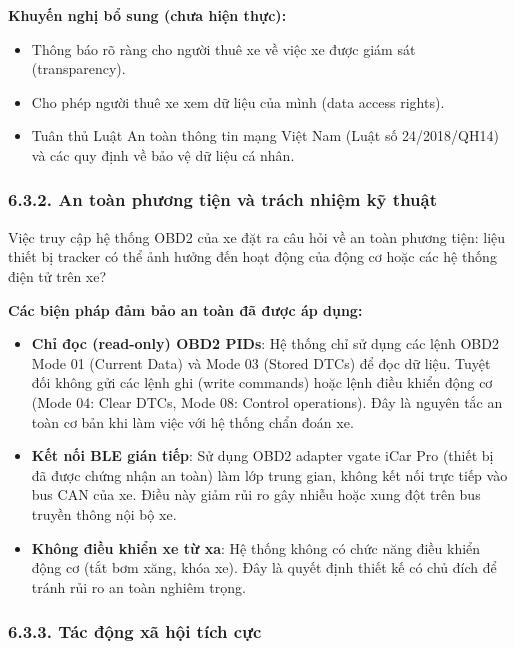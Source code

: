 \documentclass[13pt,a4paper]{extarticle}
\renewcommand{\\}{\thesislongtableorignewline\hline}%
\providecommand{\tightlist}{%
  \setlength{\itemsep}{0pt}\setlength{\parskip}{0pt}}
\begin{document}
\textbf{Khuyến nghị bổ sung (chưa hiện thực):}

\begin{itemize}
\tightlist
\item
  Thông báo rõ ràng cho người thuê xe về việc xe được giám sát
  (transparency).
\item
  Cho phép người thuê xe xem dữ liệu của mình (data access rights).
\item
  Tuân thủ Luật An toàn thông tin mạng Việt Nam (Luật số 24/2018/QH14)
  và các quy định về bảo vệ dữ liệu cá nhân.
\end{itemize}

\subsubsection{6.3.2. An toàn phương tiện và trách nhiệm kỹ
thuật}\label{632-an-touxe0n-phux1b0ux1a1ng-tiux1ec7n-vuxe0-truxe1ch-nhiux1ec7m-kux1ef9-thuux1eadt}

Việc truy cập hệ thống OBD2 của xe đặt ra câu hỏi về an toàn phương
tiện: liệu thiết bị tracker có thể ảnh hưởng đến hoạt động của động cơ
hoặc các hệ thống điện tử trên xe?

\textbf{Các biện pháp đảm bảo an toàn đã được áp dụng:}

\begin{itemize}
\tightlist
\item
  \textbf{Chỉ đọc (read-only) OBD2 PIDs}: Hệ thống chỉ sử dụng các lệnh
  OBD2 Mode 01 (Current Data) và Mode 03 (Stored DTCs) để đọc dữ liệu.
  Tuyệt đối không gửi các lệnh ghi (write commands) hoặc lệnh điều khiển
  động cơ (Mode 04: Clear DTCs, Mode 08: Control operations). Đây là
  nguyên tắc an toàn cơ bản khi làm việc với hệ thống chẩn đoán xe.
\item
  \textbf{Kết nối BLE gián tiếp}: Sử dụng OBD2 adapter vgate iCar Pro
  (thiết bị đã được chứng nhận an toàn) làm lớp trung gian, không kết
  nối trực tiếp vào bus CAN của xe. Điều này giảm rủi ro gây nhiễu hoặc
  xung đột trên bus truyền thông nội bộ xe.
\item
  \textbf{Không điều khiển xe từ xa}: Hệ thống không có chức năng điều
  khiển động cơ (tắt bơm xăng, khóa xe). Đây là quyết định thiết kế có
  chủ đích để tránh rủi ro an toàn nghiêm trọng.
\end{itemize}

\subsubsection{6.3.3. Tác động xã hội tích
cực}\label{633-tuxe1c-ux111ux1ed9ng-xuxe3-hux1ed9i-tuxedch-cux1ef1c}
\end{document}
